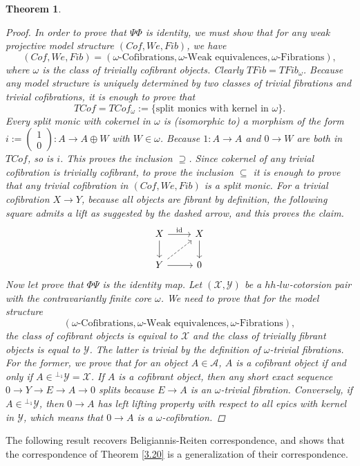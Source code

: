 \documentclass[12pt]{amsart}
\numberwithin{equation}{section}
\newtheorem{theorem}[lemma]{Theorem}
\theoremstyle{definition}
\DeclareMathOperator{\id}{id}
\newtheorem*{theorem 0*}{Theorem}
\newtheorem*{theorem a*}{Theorem A}
\newtheorem*{theorem b*}{Theorem B}
\numberwithin{diagram}{section}
\begin{document}
\begin{theorem}
\begin{proof}
In order to prove that $\Psi\Phi$ is identity, we must show that for any weak projective model structure $(Cof,We,Fib)$, we have
\[(Cof,We,Fib)=(\omega\text{-Cofibrations},\omega\text{-Weak equivalences}, \omega\text{-Fibrations}),\]
where $\omega$ is the class of trivially cofibrant objects.
Clearly $TFib=TFib_{\omega}$.
Because any model structure is uniquely determined by two classes of trivial fibrations and trivial cofibrations, it is enough to prove that
\[TCof=TCof_{\omega}:=\{\text{split monics with kernel in }\omega\}.\]
Every split monic with cokernel in $\omega$ is (isomorphic to) a morphism of the form $i:=\begin{pmatrix}
    1\\0
\end{pmatrix}:A\rightarrow A\oplus W$ with $W\in\omega$. Because $1:A\rightarrow A$ and $0\rightarrow W$ are both in $TCof$, so is $i$.
This proves the inclusion $\supseteq$. Since cokernel of any trivial cofibration is trivially cofibrant, to prove the inclusion $\subseteq$ it is enough to prove that any trivial cofibration in $(Cof,We,Fib)$ is a split monic. For a trivial cofibration $X\rightarrow Y$, because all objects are fibrant by definition, the following square admits a lift as suggested by the dashed arrow, and this proves the claim.
\[\begin{tikzcd}
	X & X \\
	Y & 0
	\arrow["\id", from=1-1, to=1-2]
	\arrow[from=1-1, to=2-1]
	\arrow[from=1-2, to=2-2]
	\arrow[dashed, from=2-1, to=1-2]
	\arrow[from=2-1, to=2-2]
\end{tikzcd}\]
Now let prove that $\Phi\Psi$ is the identity map. Let $(\mathcal{X},\mathcal{Y})$ be a $hh$-$lw$-cotorsion pair with the contravariantly finite core $\omega$. We need to prove that for the model structure
\[(\omega\text{-Cofibrations},\omega\text{-Weak equivalences}, \omega\text{-Fibrations}),\]
the class of cofibrant objects is equival to $\mathcal{X}$ and the class of trivially fibrant objects is equal to $\mathcal{Y}$. The latter is trivial by the definition of $\omega$-trivial fibrations.
For the former, we prove that for an object $A\in\mathcal{A}$, $A$ is a cofibrant object if and only if $A\in {}^{\perp_1}\mathcal{Y}=\mathcal{X}$.
If $A$ is a cofibrant object, then any short exact sequence $0\rightarrow Y\rightarrow E\rightarrow A\rightarrow 0$ splits because $E\rightarrow A$ is an $\omega$-trivial fibration. Conversely, if $A\in {}^{\perp_1}\mathcal{Y}$, then $0\rightarrow A$ has left lifting property with respect to all epics with kernel in $\mathcal{Y}$, which means that $0\rightarrow A$ is a $\omega$-cofibration.
\end{proof}
\end{theorem}
The following result recovers Beligiannis-Reiten correspondence, and shows that the correspondence of Theorem \ref{3.20} is a generalization of their correspondence.
\end{document}
